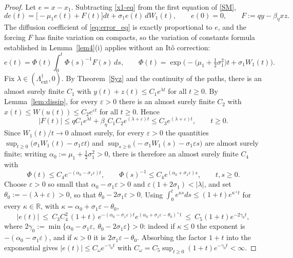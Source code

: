 \documentclass{article}
\newcommand{\betaeta}{\beta_\eta}
\newcommand{\Lsharp}{\Lambda_{\mathrm{ext}}^{\dagger}}
\begin{document}
\begin{proof}
Let $e=x-x_1$. Subtracting \eqref{x1-eq} from the first equation of \eqref{SM},
\begin{equation}\label{eq:error_eq}
de(t)=\big[-\mu_1e(t)+F(t)\big]dt+\sigma_1e(t)\,dW_1(t),\qquad e(0)=0,\qquad F:=qy-\betaeta xz .
\end{equation}
The diffusion coefficient of \eqref{eq:error_eq} is exactly proportional to $e$, and the forcing $F$ has finite variation on compacts, so the variation of constants formula established in Lemma~\ref{lem4}(i) applies without an It\^o correction:
\begin{equation}\label{eq:varconst}
e(t)=\Phi(t)\int_0^t\Phi(s)^{-1}F(s)\,ds,\qquad \Phi(t)=\exp\Big(-\big(\mu_1+\tfrac12\sigma_1^2\big)t+\sigma_1W_1(t)\Big).
\end{equation}
Fix $\lambda\in(\Lsharp,0)$. By Theorem~\ref{Syz} and the continuity of the paths, there is an almost surely finite $C_1$ with $y(t)+z(t)\le C_1e^{\lambda t}$ for all $t\ge0$. By Lemma~\ref{lem:dissip}, for every $\varepsilon>0$ there is an almost surely finite $C_2$ with $x(t)\le W(u(t))\le C_2e^{\varepsilon t}$ for all $t\ge0$. Hence
\[
|F(t)|\le qC_1e^{\lambda t}+\betaeta C_1C_2e^{(\lambda+\varepsilon)t}\le C_3e^{(\lambda+\varepsilon)t},\qquad t\ge0 .
\]
Since $W_1(t)/t\to0$ almost surely, for every $\varepsilon>0$ the quantities $\sup_{t\ge0}\big(\sigma_1W_1(t)-\sigma_1\varepsilon t\big)$ and $\sup_{s\ge0}\big(-\sigma_1W_1(s)-\sigma_1\varepsilon s\big)$ are almost surely finite; writing $\alpha_0:=\mu_1+\tfrac12\sigma_1^2>0$, there is therefore an almost surely finite $C_4$ with
\[
\Phi(t)\le C_4e^{-(\alpha_0-\sigma_1\varepsilon)t},\qquad \Phi(s)^{-1}\le C_4e^{(\alpha_0+\sigma_1\varepsilon)s},\qquad t,s\ge0 .
\]
Choose $\varepsilon>0$ so small that $\alpha_0-\sigma_1\varepsilon>0$ and $\varepsilon(1+2\sigma_1)<|\lambda|$, and set $\theta_0:=-(\lambda+\varepsilon)>0$, so that $\theta_0-2\sigma_1\varepsilon>0$. Using $\int_0^te^{\kappa s}ds\le(1+t)e^{\kappa^+t}$ for every $\kappa\in\mathbb{R}$, with $\kappa=\alpha_0+\sigma_1\varepsilon-\theta_0$,
\[
|e(t)|\ \le\ C_3C_4^2\,(1+t)\,e^{-(\alpha_0-\sigma_1\varepsilon)t}e^{(\alpha_0+\sigma_1\varepsilon-\theta_0)^+t}\ \le\ C_5(1+t)e^{-2\gamma_0t},
\]
where $2\gamma_0:=\min\{\alpha_0-\sigma_1\varepsilon,\ \theta_0-2\sigma_1\varepsilon\}>0$: indeed if $\kappa\le0$ the exponent is $-(\alpha_0-\sigma_1\varepsilon)$, and if $\kappa>0$ it is $2\sigma_1\varepsilon-\theta_0$. Absorbing the factor $1+t$ into the exponential gives $|e(t)|\le C_\omega e^{-\gamma_0t}$ with $C_\omega=C_5\sup_{t\ge0}(1+t)e^{-\gamma_0t}<\infty$.
\end{proof}
\end{document}

